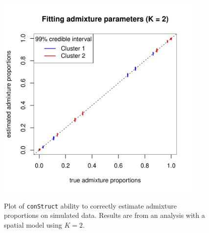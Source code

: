 \documentclass[12pt]{article}
\begin{document}
\begin{figure}
	\centering
		{\includegraphics[width=4in,height=4in]{figs/sims/simK2_adprop_fit.pdf}}
		\caption{
			Plot of \texttt{conStruct} ability to correctly estimate admixture proportions on simulated data.
			Results are from an analysis with a spatial model using $K=2$.
		}\label{simK2_adprop_fit}
\end{figure}
\end{document}
